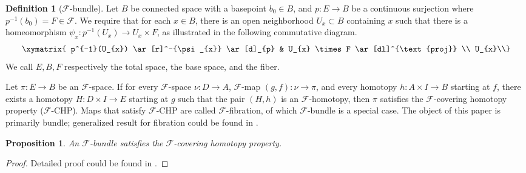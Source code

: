\documentclass[psamsfonts]{amsart}
\newtheorem{prop}[thm]{Proposition}
\theoremstyle{definition}
\newtheorem{defn}[thm]{Definition}
\theoremstyle{remark}
\numberwithin{equation}{section}
\begin{document}
\begin{defn}[$\mathcal{F}$-bundle]
Let $B$ be connected space with a basepoint $b_{0} \in B$, and $p: E \rightarrow B$ be a continuous surjection where $p^{-1}(b_{0}) = F \in \mathcal{F}$. We require that for each $x \in B$, there is an open neighborhood $U_{x} \subset B$ containing $x$ such that there is a homeomorphism $\psi_{x}: p^{-1}(U_{x}) \rightarrow U_{x} \times F$, as illustrated in the following commutative diagram. 
\[\xymatrix{
p^{-1}(U_{x}) \ar[r]^-{\psi_{x}} \ar[d]_{p} & U_{x} \times F \ar[dl]^{\text{proj}} \\
U_{x}\\} \]
We call $E, B, F$ respectively the total space, the base space, and the fiber.
\end{defn}

Let $\pi: E \to B$ be an $\mathcal{F}$-space. If for every $\mathcal{F}$-space $\nu: D \to A$, $\mathcal{F}$-map $(g,f) : \nu \to \pi$, and every homotopy $h : A \times I \to B$ starting at $f$, there exists a homotopy $H : D \times I \to E$ starting at $g$ such that the pair $(H, h)$ is an $\mathcal{F}$-homotopy, then $\pi$ satisfies the $\mathcal{F}$-covering homotopy property ($\mathcal{F}$-CHP). Maps that satisfy $\mathcal{F}$-CHP are called $\mathcal{F}$-fibration, of which $\mathcal{F}$-bundle is a special case. The object of this paper is primarily bundle; generalized result for fibration could be found in \cite[Chapter 5 - 11]{Classifying}.

\begin{prop}
\label{prop:CHP}
An $\mathcal{F}$-bundle satisfies the $\mathcal{F}$-covering homotopy property.
\end{prop}
\begin{proof}
Detailed proof could be found in \cite[Theorem 11.7]{Steenrod}.	
\end{proof}
\end{document}
